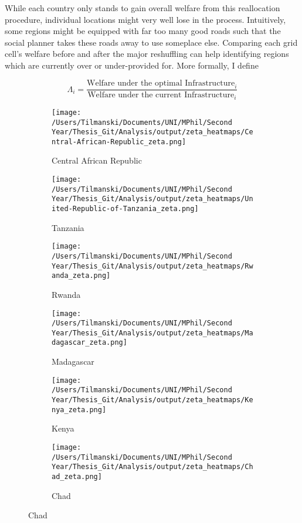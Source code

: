 \documentclass[11pt, oneside]{article}   	%
\begin{document}
While each country only stands to gain overall welfare from this reallocation procedure, individual locations might very well lose in the process. Intuitively, some regions might be equipped with far too many good roads such that the social planner takes these roads away to use someplace else. Comparing each grid cell's welfare before and after the major reshuffling can help identifying regions which are currently over or under-provided for. More formally, I define

\begin{equation}
  \Lambda_{i} = \frac{\textrm{Welfare under the optimal Infrastructure}_{i}}{\textrm{Welfare under the current Infrastructure}_{i}}
\end{equation}

\begin{figure}
\centering
\caption{Spatial Distribution of $\Lambda_{i}$ for sample countries}

\begin{subfigure}[c]{0.32\textwidth}
\texttt{[image: /Users/Tilmanski/Documents/UNI/MPhil/Second Year/Thesis\_Git/Analysis/output/zeta\_heatmaps/Central-African-Republic\_zeta.png]}
\caption{Central African Republic}
\label{fig:Central African Republic_zeta}
\end{subfigure}
\begin{subfigure}[c]{0.32\textwidth}
\texttt{[image: /Users/Tilmanski/Documents/UNI/MPhil/Second Year/Thesis\_Git/Analysis/output/zeta\_heatmaps/United-Republic-of-Tanzania\_zeta.png]}
\caption{Tanzania}
\label{fig:Tanzania_zeta}
\end{subfigure}
\begin{subfigure}[c]{0.32\textwidth}
\texttt{[image: /Users/Tilmanski/Documents/UNI/MPhil/Second Year/Thesis\_Git/Analysis/output/zeta\_heatmaps/Rwanda\_zeta.png]}
\caption{Rwanda}
\label{fig:Rwanda_zeta}
\end{subfigure}

\begin{subfigure}[c]{0.32\textwidth}
\texttt{[image: /Users/Tilmanski/Documents/UNI/MPhil/Second Year/Thesis\_Git/Analysis/output/zeta\_heatmaps/Madagascar\_zeta.png]}
\caption{Madagascar}
\label{fig:Madagascar_zeta}
\end{subfigure}
\begin{subfigure}[c]{0.32\textwidth}
\texttt{[image: /Users/Tilmanski/Documents/UNI/MPhil/Second Year/Thesis\_Git/Analysis/output/zeta\_heatmaps/Kenya\_zeta.png]}
\caption{Kenya}
\label{fig:Kenya_zeta}
\end{subfigure}
\begin{subfigure}[c]{0.32\textwidth}
\texttt{[image: /Users/Tilmanski/Documents/UNI/MPhil/Second Year/Thesis\_Git/Analysis/output/zeta\_heatmaps/Chad\_zeta.png]}
\caption{Chad}
\label{fig:Chad_zeta}
\end{subfigure}




\end{figure}
\end{document}
